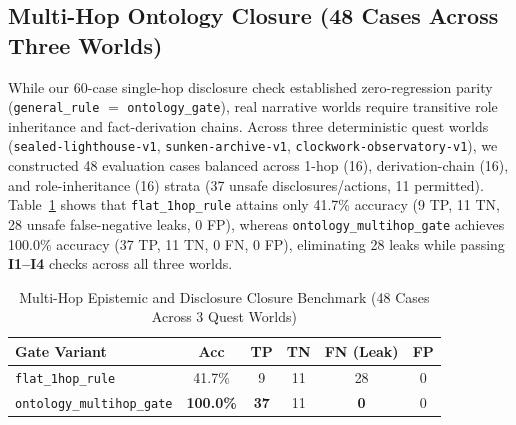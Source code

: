 \subsection{Multi-Hop Ontology Closure (48 Cases Across Three Worlds)}\label{sec:multihop-eval}
While our 60-case single-hop disclosure check established zero-regression parity (\texttt{general\_rule} $=$ \texttt{ontology\_gate}), real narrative worlds require transitive role inheritance and fact-derivation chains. Across three deterministic quest worlds (\texttt{sealed-}\allowbreak\texttt{lighthouse-}\allowbreak\texttt{v1}, \texttt{sunken-}\allowbreak\texttt{archive-}\allowbreak\texttt{v1}, \texttt{clockwork-}\allowbreak\texttt{observatory-}\allowbreak\texttt{v1}), we constructed 48 evaluation cases balanced across 1-hop (16), derivation-chain (16), and role-inheritance (16) strata (37 unsafe disclosures/actions, 11 permitted). Table~\ref{tab:multihop-ontology} shows that \texttt{flat\_}\allowbreak\texttt{1hop\_}\allowbreak\texttt{rule} attains only 41.7\% accuracy (9 TP, 11 TN, 28 unsafe false-negative leaks, 0 FP), whereas \texttt{ontology\_}\allowbreak\texttt{multihop\_}\allowbreak\texttt{gate} achieves 100.0\% accuracy (37 TP, 11 TN, 0 FN, 0 FP), eliminating 28 leaks while passing \textbf{I1--I4} checks across all three worlds.

\begin{table}[!tbp]
\caption{Multi-Hop Epistemic and Disclosure Closure Benchmark (48 Cases Across 3 Quest Worlds)}
\label{tab:multihop-ontology}
\centering
\footnotesize
\setlength{\tabcolsep}{3.5pt}
\begin{tabularx}{\columnwidth}{@{}>{\raggedright\arraybackslash}X*{5}{c}@{}}
\toprule
\textbf{Gate Variant} & \textbf{Acc} & \textbf{TP} & \textbf{TN} & \textbf{FN (Leak)} & \textbf{FP} \\
\midrule
\texttt{flat\_}\allowbreak\texttt{1hop\_}\allowbreak\texttt{rule} & 41.7\% & 9 & 11 & 28 & 0 \\
\texttt{ontology\_}\allowbreak\texttt{multihop\_}\allowbreak\texttt{gate} & \textbf{100.0\%} & \textbf{37} & 11 & \textbf{0} & 0 \\
\bottomrule
\end{tabularx}
\end{table}

